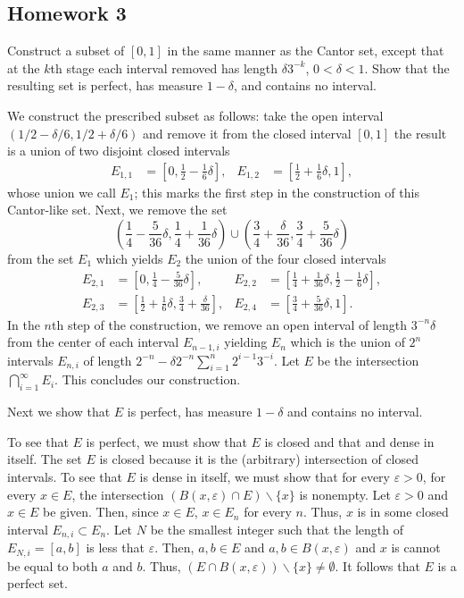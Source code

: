 \subsection{Homework 3}
\begin{problem}
  Construct a subset of $[0,1]$ in the same manner as the Cantor set,
  except that at the $k$th stage each interval removed has length
  $\delta 3^{-k}$, $0<\delta<1$. Show that the resulting set is perfect,
  has measure $1-\delta$, and contains no interval.
\end{problem}
\begin{solution}
  We construct the prescribed subset as follows: take the open interval
  $(1/2-\delta/6,1/2+\delta/6)$ and remove it from the closed interval
  $[0,1]$ the result is a union of two disjoint closed intervals
  \[
    \begin{aligned}
    E_{1,1}&=\left[0,\frac{1}{2}-\frac{1}{6}\delta\right],&
    E_{1,2}&=\left[\frac{1}{2}+\frac{1}{6}\delta,1\right],
    \end{aligned}
  \]
  whose union we call $E_1$; this marks the first step in the construction
  of this Cantor-like set. Next, we remove the set
  \[
    \left(\frac{1}{4}-\frac{5}{36}\delta,\frac{1}{4}+\frac{1}{36}\delta\right)
    \cup
    \left(\frac{3}{4}+\frac{\delta}{36},\frac{3}{4}+\frac{5}{36}\delta\right)
  \]
  from the set $E_1$ which yields $E_2$ the union of the four closed
  intervals
  \[
    \begin{aligned}
      E_{2,1}&=\left[0,\frac{1}{4}-\frac{5}{36}\delta\right],&
      E_{2,2}&=\left[\frac{1}{4}+\frac{1}{36}\delta,
        \frac{1}{2}-\frac{1}{6}\delta\right],\\
      E_{2,3}&=\left[\frac{1}{2}+\frac{1}{6}\delta,
        \frac{3}{4}+\frac{\delta}{36}\right],&
      E_{2,4}&=\left[\frac{3}{4}+\frac{5}{36}\delta,1\right].
    \end{aligned}
  \]
  In the $n$th step of the construction, we remove an open interval of
  length $3^{-n}\delta$ from the center of each interval $E_{n-1,i}$
  yielding $E_n$ which is the union of $2^n$ intervals $E_{n,i}$ of length
  $2^{-n}-\delta 2^{-n}\sum_{i=1}^n2^{i-1}3^{-i}$. Let $E$ be the intersection
  $\bigcap_{i=1}^\infty E_i$. This concludes our construction.

  Next we show that $E$ is perfect, has measure $1-\delta$ and contains no
  interval.

  To see that $E$ is perfect, we must show that $E$ is closed and that
  and dense in itself. The set $E$ is closed because it is the (arbitrary)
  intersection of closed intervals. To see that $E$ is dense in itself, we
  must show that for every $\varepsilon>0$, for every $x\in E$, the
  intersection $(B(x,\varepsilon)\cap E)\smallsetminus\{x\}$ is
  nonempty. Let $\varepsilon>0$ and $x\in E$ be given. Then, since
  $x\in E$, $x\in E_n$ for every $n$. Thus, $x$ is in some closed interval
  $E_{n,i}\subset E_n$. Let $N$ be the smallest integer such that the
  length of $E_{N,i}=[a,b]$ is less that $\varepsilon$. Then, $a,b\in E$
  and $a,b\in B(x,\varepsilon)$ and $x$ is cannot be equal to both $a$ and
  $b$. Thus, $(E\cap B(x,\varepsilon))\smallsetminus\{x\}\neq\emptyset$. It
  follows that $E$ is a perfect set.


\end{solution}
